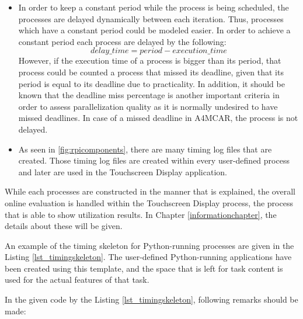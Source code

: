 \begin{itemize}
	\item In order to keep a constant period while the process is being scheduled, the processes are delayed dynamically between each iteration. Thus, processes which have a constant period could be modeled easier. In order to achieve a constant period each process are delayed by the following:
	\begin{equation}
	delay\texttt{\_}time=period - execution\texttt{\_}time
	\end{equation}
	However, if the execution time of a process is bigger than its period, that process could be counted a process that missed its deadline, given that its period is equal to its deadline due to practicality. In addition, it should be known that the deadline miss percentage is another important criteria in order to assess parallelization quality as it is normally undesired to have missed deadlines. In case of a missed deadline in A4MCAR, the process is not delayed.
	
	\item As seen in \ref{fig:rpicomponents}, there are many timing log files that are created. Those timing log files are created within every user-defined process and later are used in the Touchscreen Display application.
\end{itemize}

While each processes are constructed in the manner that is explained, the overall online evaluation is handled within the Touchscreen Display process, the process that is able to show utilization results. In Chapter \ref{informationchapter}, the details about these will be given.

An example of the timing skeleton for Python-running processes are given in the Listing \ref{lst_timingskeleton}. The user-defined Python-running applications have been created using this template, and the space that is left for task content is used for the actual features of that task.



In the given code by the Listing \ref{lst_timingskeleton}, following remarks should be made:

